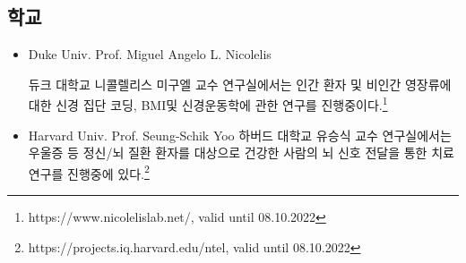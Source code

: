 \documentclass[11pt, a4paper]{article}
\begin{document}
\subsection{학교}
\begin{itemize}
    \item Duke Univ. Prof. Miguel Angelo L. Nicolelis

    듀크 대학교 니콜렐리스 미구엘 교수 연구실에서는 인간 환자 및 비인간 영장류에 대한 신경 집단 코딩, BMI및 신경운동학에 관한 연구를 진행중이다.\footnote{https://www.nicolelislab.net/, valid until 08.10.2022}
    \item Harvard Univ. Prof. Seung-Schik Yoo
    하버드 대학교 유승식 교수 연구실에서는 우울증 등 정신/뇌 질환 환자를 대상으로 건강한 사람의 뇌 신호 전달을 통한 치료 연구를 진행중에 있다.\footnote{https://projects.iq.harvard.edu/ntel, valid until 08.10.2022}
\end{itemize}
\end{document}
